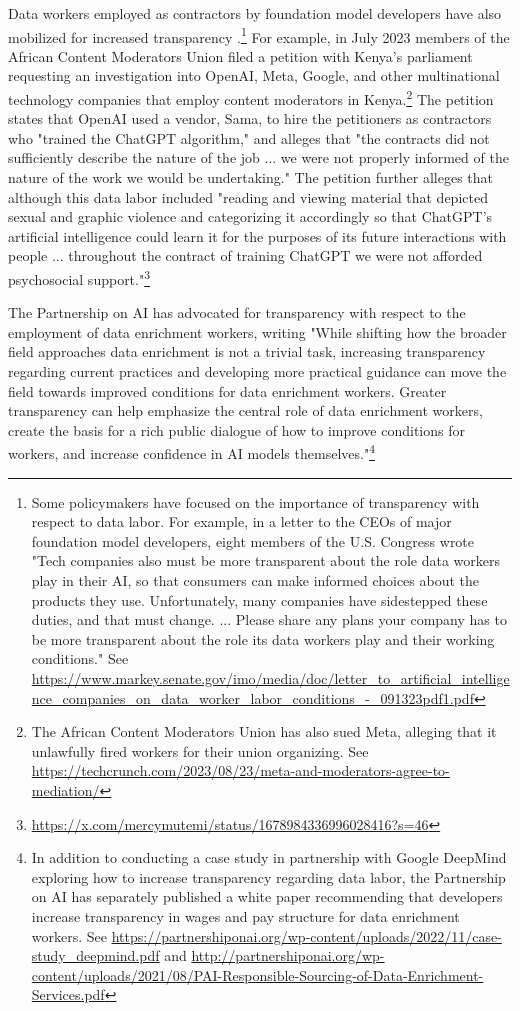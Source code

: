 \documentclass[screen, authorversion, acmsmall]{acmart}
\begin{document}
Data workers employed as contractors by foundation model developers have also mobilized for increased transparency \citep{gray_ghost_2019}.\footnote{Some policymakers have focused on the importance of transparency with respect to data labor. For example, in a letter to the CEOs of major foundation model developers, eight members of the U.S. Congress wrote "Tech companies also must be more transparent about the role data workers play in their AI, so that consumers can make informed choices about the products they use. Unfortunately, many companies have sidestepped these duties, and that must change. ... Please share any plans your company has to be more transparent about the role its data workers play and their working conditions." See \url{https://www.markey.senate.gov/imo/media/doc/letter_to_artificial_intelligence_companies_on_data_worker_labor_conditions_-_091323pdf1.pdf}}
For example, in July 2023 members of the African Content Moderators Union filed a petition with Kenya's parliament requesting an investigation into OpenAI, Meta, Google, and other multinational technology companies that employ content moderators in Kenya.\footnote{The African Content Moderators Union has also sued Meta, alleging that it unlawfully fired workers for their union organizing. See \url{https://techcrunch.com/2023/08/23/meta-and-moderators-agree-to-mediation/}} 
The petition states that OpenAI used a vendor, Sama, to hire the petitioners as contractors who "trained the ChatGPT algorithm," and alleges that "the contracts did not sufficiently describe the nature of the job ... we were not properly informed of the nature of the work we would be undertaking." The petition further alleges that although this data labor included "reading and viewing material that depicted sexual and graphic violence and categorizing it accordingly so that ChatGPT's artificial intelligence could learn it for the purposes of its future interactions with people ... throughout the contract of training ChatGPT we were not afforded psychosocial support."\footnote{\url{https://x.com/mercymutemi/status/1678984336996028416?s=46}}

The Partnership on AI has advocated for transparency with respect to the employment of data enrichment workers, writing "While shifting how the broader field approaches data enrichment is not a trivial task, increasing transparency regarding current practices and developing more practical guidance can move the field towards improved conditions for data enrichment workers. Greater transparency can help emphasize the central role of data enrichment workers, create the basis for a rich public dialogue of how to improve conditions for workers, and increase confidence in AI models themselves."\footnote{In addition to conducting a case study in partnership with Google DeepMind exploring how to increase transparency regarding data labor, the Partnership on AI has separately published a white paper recommending that developers increase transparency in wages and pay structure for data enrichment workers. See \url{https://partnershiponai.org/wp-content/uploads/2022/11/case-study_deepmind.pdf} and \url{http://partnershiponai.org/wp-content/uploads/2021/08/PAI-Responsible-Sourcing-of-Data-Enrichment-Services.pdf}}
\end{document}
